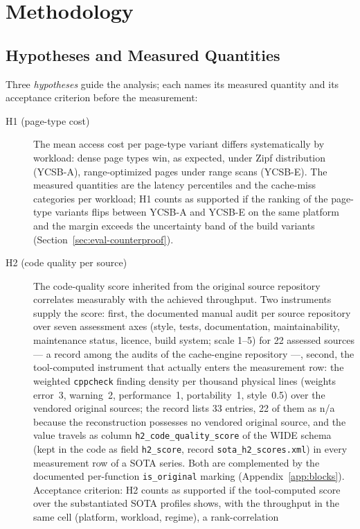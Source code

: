 \section{Methodology}\label{sec:eval-method}
\subsection{Hypotheses and Measured Quantities}\label{sec:eval-hypotheses}
Three \emph{hypotheses} guide the analysis; each names its measured quantity and its acceptance
criterion before the measurement:
\begin{description}
  \item[H1 (page-type cost)] The mean access cost per page-type variant differs systematically by
  workload: dense page types win, as expected, under Zipf distribution (YCSB-A), range-optimized pages
  under range scans (YCSB-E). The measured quantities are the latency percentiles and the cache-miss
  categories per workload; H1 counts as supported if the ranking of the page-type variants flips
  between YCSB-A and YCSB-E on the same platform and the margin exceeds the uncertainty band of the
  build variants (Section~\ref{sec:eval-counterproof}).
  \item[H2 (code quality per source)] The code-quality score inherited from the original source
  repository correlates measurably with the achieved throughput. Two instruments supply the score:
  first, the documented manual audit per source repository over seven assessment axes (style, tests,
  documentation, maintainability, maintenance status, licence, build system; scale 1--5) for 22
  assessed sources --- a record among the audits of the cache-engine repository ---, second, the
  tool-computed instrument that actually enters the measurement row: the weighted
  \texttt{cppcheck} finding density per thousand physical lines (weights error~3, warning~2,
  performance~1, portability~1, style~0.5) over the vendored original sources; the record lists 33
  entries, 22 of them as n/a because the reconstruction possesses no vendored original source, and the
  value travels as column \texttt{h2\_code\_quality\_score} of the WIDE schema (kept in the code as
  field \texttt{h2\_score}, record \texttt{sota\_h2\_scores.xml}) in every measurement row of a
  SOTA series. Both are complemented
  by the documented per-function \texttt{is\_original} marking (Appendix~\ref{app:blocks}).
  Acceptance criterion: H2 counts as supported if the tool-computed score over the substantiated SOTA
  profiles shows, with the throughput in the same cell (platform, workload, regime), a rank-correlation

\end{description}
